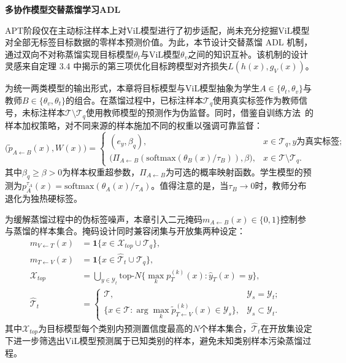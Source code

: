 \noindent\textbf{多协作模型交替蒸馏学习ADL}

APT阶段仅在主动标注样本上对ViL模型进行了初步适配，尚未充分挖掘ViL模型对全部无标签目标数据的零样本预测价值。为此，本节设计交替蒸馏 ADL 机制，通过双向不对称蒸馏实现目标模型$\theta_t$与ViL模型$\theta_v$之间的知识互补。该机制的设计灵感来自定理 3.4 中揭示的第三项优化目标跨模型对齐损失$L(h(x),g_V(x))$。

为统一两类模型的输出形式，本章将目标模型与ViL模型抽象为学生$A\in\{\theta_t,\theta_v\}$与教师$B\in\{\theta_v,\theta_t\}$的组合。在蒸馏过程中，已标注样本$\mathcal{T}_q$使用真实标签作为教师信号，未标注样本$\mathcal{T}\setminus\mathcal{T}_q$使用教师模型的预测作为伪监督。同时，借鉴自训练方法~\cite{liang2021source}的样本加权策略，对不同来源的样本施加不同的权重以强调可靠监督：
\begin{equation}
\big(\tilde{p}_{A\leftarrow B}(x), W(x)\big) =
\begin{cases}
(e_y, \beta_q), & x\in\mathcal{T}_q, y\text{为真实标签};\\
\big(\Pi_{A\leftarrow B}(\mathrm{softmax}(\theta_B(x)/\tau_B)), \beta\big), & x\in\mathcal{T}\setminus\mathcal{T}_q.
\end{cases}
\label{eq:teacher_dist}
\end{equation}
其中$\beta_q\geq\beta>0$为样本权重超参数，$\Pi_{A\leftarrow B}$为可选的概率映射函数。学生模型的预测为$p_A^{\tau_A}(x)=\mathrm{softmax}(\theta_A(x)/\tau_A)$。值得注意的是，当$\tau_B\to 0$时，教师分布退化为独热硬标签。

为缓解蒸馏过程中的伪标签噪声，本章引入二元掩码$m_{A\leftarrow B}(x)\in\{0,1\}$控制参与蒸馏的样本集合。掩码设计同时兼容闭集与开放集两种设定：
\begin{align}
m_{V\leftarrow T}(x) &= \mathbf{1}\{x\in\mathcal{X}_{top}\cup\mathcal{T}_q\}, &\\
m_{T\leftarrow V}(x) &= \mathbf{1}\{x\in\hat{\mathcal{T}}_t\cup\mathcal{T}_q\}, &\\[3pt]
\mathcal{X}_{top} &= \bigcup_{y\in\mathcal{Y}_t}\mathrm{top}\text{-}N\big\{\max_k p_T^{(k)}(x) : \hat{y}_T(x)=y\big\}, \label{eq:topX} &\\[3pt]
\hat{\mathcal{T}}_t &=
\begin{cases}
\mathcal{T}, & \mathcal{Y}_s=\mathcal{Y}_t;\\
\{x\in\mathcal{T}: \arg\max_k\tilde{p}_{T\leftarrow V}^{(k)}(x)\in\mathcal{Y}_s\}, & \mathcal{Y}_s\subset\mathcal{Y}_t.
\end{cases}
\end{align}
其中$\mathcal{X}_{top}$为目标模型每个类别内预测置信度最高的$N$个样本集合，$\hat{\mathcal{T}}_t$在开放集设定下进一步筛选出ViL模型预测属于已知类别的样本，避免未知类别样本污染蒸馏过程。

